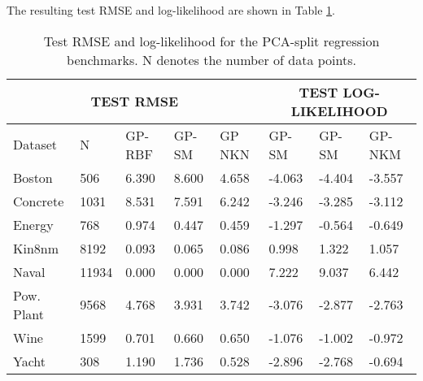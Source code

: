 \documentclass[9pt,a4paper,twoside]{tau}
\begin{document}
 The resulting test RMSE and log-likelihood are shown in Table \ref{tab:tbl1}.
 \begin{table}[H]
                \centering
                \caption{Test RMSE and log-likelihood for the PCA-split regression benchmarks. N denotes the number of data points.}
    		\label{tab:tbl1}
                \begin{tabular}{|p{7mm}|p{7mm}|p{7mm}|p{7mm}|p{7mm}|p{7mm}|p{7mm}|p{7mm}|}
            	\toprule
                    \multicolumn{5}{|c|}{TEST RMSE} & \multicolumn{3}{|c|}{TEST LOG-LIKELIHOOD} \\
                    \midrule
                    Data\-set&N&GP-RBF&GP-SM&GP NKN&GP-SM&GP-SM&GP-NKM\\
                    \hline
                    Bos\-ton&506&6.390&8.600&4.658&\mbox-4.063&\mbox-4.404&\mbox-3.557\\
                    \hline
                    Con\-crete&1031&8.531&7.591&6.242&\mbox-3.246&\mbox-3.285&\mbox-3.112\\
                    \hline
                    Ene\-rgy&768&0.974&0.447&0.459&\mbox-1.297&\mbox-0.564&\mbox-0.649\\
                    \hline
                    Kin\-8nm&8192&0.093&0.065&0.086&0.998&1.322&1.057\\
                    \hline
                    Naval&11934&0.000&0.000&0.000&7.222&9.037&6.442\\
                    \hline
                    Pow. Plant&9568&4.768&3.931&3.742&\mbox-3.076&\mbox-2.877&\mbox-2.763\\
                    \hline
                    Wine&1599&0.701&0.660&0.650&\mbox-1.076&\mbox-1.002&\mbox-0.972\\
                    \hline
                    Yacht&308&1.190&1.736&0.528&\mbox-2.896&\mbox-2.768&\mbox-0.694\\
                    \bottomrule
                \end{tabular}
                    
            \end{table}
					
\end{document}
